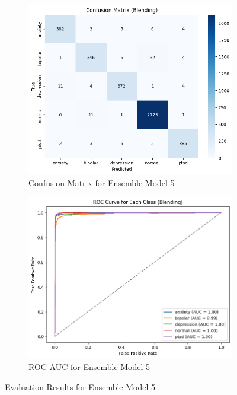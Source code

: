 \begin{figure}[h!]
    \centering
    \begin{subfigure}[b]{0.49\textwidth}
        \centering
        \includegraphics[width=\textwidth]{Images/BLD CM.png}
        \caption{Confusion Matrix for Ensemble Model 5}
        \label{bld cm}  %
    \end{subfigure}
    \hfill
    \begin{subfigure}[b]{0.49\textwidth}
        \centering
        \includegraphics[width=\textwidth]{Images/BLD ROC.png}
        \caption{ROC AUC for Ensemble Model 5}
        \label{bld roc}  %
    \end{subfigure}
    \caption{Evaluation Results for Ensemble Model 5}
    \label{fig:ensemble_model5_comparison}
\end{figure}

